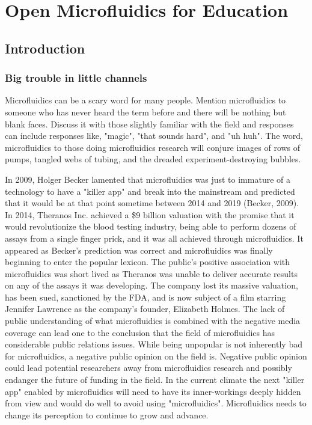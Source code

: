 \chapter{Open Microfluidics for Education}
\label{App:OpenMicrofluidics}

\section{Introduction}

\subsection{Big trouble in little channels}
Microfluidics can be a scary word for many people. Mention microfluidics to someone who has never heard the term before and there will be nothing but blank faces. Discuss it with those slightly familiar with the field and responses can include responses like, "magic", "that sounds hard", and "uh huh". The word, microfluidics to those doing microfluidics research will conjure images of rows of pumps, tangled webs of tubing, and the dreaded experiment-destroying bubbles.

In 2009, Holger Becker lamented that microfluidics was just to immature of a technology to have a "killer app" and break into the mainstream and predicted that it would be at that point sometime between 2014 and 2019 (Becker, 2009). In 2014, Theranos Inc. achieved a \$9 billion valuation with the promise that it would revolutionize the blood testing industry, being able to perform dozens of assays from a single finger prick, and it was all achieved through microfluidics. It appeared as Becker's prediction was correct and microfluidics was finally beginning to enter the popular lexicon. The public's positive association with microfluidics was short lived as Theranos was unable to deliver accurate results on any of the assays it was developing. The company lost its massive valuation, has been sued, sanctioned by the FDA, and is now subject of a film starring Jennifer Lawrence as the company's founder, Elizabeth Holmes. The lack of public understanding of what microfluidics is combined with the negative media coverage can lead one to the conclusion that the field of microfluidics has considerable public relations issues. While being unpopular is not inherently bad for microfluidics, a negative public opinion on the field is. Negative public opinion could lead potential researchers away from microfluidics research and possibly endanger the future of funding in the field. In the current climate the next "killer app" enabled by microfluidics will need to have its inner-workings deeply hidden from view and would do well to avoid using "microfluidics". Microfluidics needs to change its perception to continue to grow and advance.

